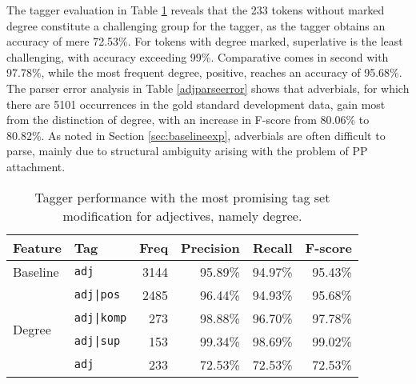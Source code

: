 \documentclass[a4paper,12pt,english]{book}
\begin{document}
The tagger evaluation in Table \ref{adjtagerror} reveals that the 233
tokens without marked degree constitute a challenging group for the tagger, as
the tagger obtains an accuracy of mere 72.53\%. For tokens with degree marked,
superlative is the least challenging, with accuracy exceeding 99\%.
Comparative comes in second with 97.78\%, while the most frequent degree,
positive, reaches an accuracy of 95.68\%. The parser error analysis in Table
\ref{adjparseerror} shows that adverbials, for which there are 5101 occurrences
in the gold standard development data, gain most from the distinction of
degree, with an increase in F-score from 80.06\% to 80.82\%. As noted in
Section \ref{sec:baselineexp}, adverbials are often difficult to parse, mainly
due to structural ambiguity arising with the problem of PP attachment.

\begin{table}
    \centering
    \smaller[0.5]
    \begin{tabular}{@{}llrrrr@{}}
        \toprule
        \textbf{Feature} & \textbf{Tag} & \textbf{Freq} & \textbf{Precision} &
        \textbf{Recall} & \textbf{F-score} \\
        \midrule
        Baseline & \texttt{adj} & 3144 & 95.89\% & 94.97\% & 95.43\% \\
        \midrule
        \multirow{4}{*}{Degree}
        & \texttt{adj|pos} & 2485 & 96.44\% & 94.93\% & 95.68\% \\
        & \texttt{adj|komp} & 273 & 98.88\% & 96.70\% & 97.78\% \\
        & \texttt{adj|sup} & 153 & 99.34\% & 98.69\% & 99.02\% \\
        & \texttt{adj} & 233 & 72.53\% & 72.53\% & 72.53\% \\
        \bottomrule
    \end{tabular}
    \caption{Tagger performance with the most promising tag set
        modification for adjectives, namely degree.}
    \label{adjtagerror}
\end{table}

\end{document}
